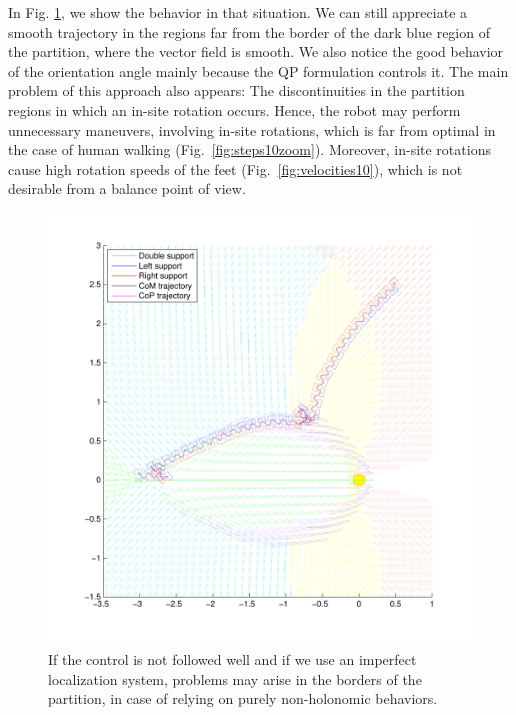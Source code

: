In Fig. \ref{fig:steps10}, we show the behavior in that situation. We can still appreciate a smooth trajectory in the regions far from the border of the dark blue region of the partition, where the vector field is smooth. We also notice the good behavior of the orientation angle mainly because the QP formulation controls it. The main problem of this approach also appears: The discontinuities in the partition regions in which an in-site rotation occurs. Hence, the robot may perform unnecessary maneuvers, involving in-site rotations, which is far from optimal in the case of human walking (Fig.~\ref{fig:steps10zoom}). Moreover, in-site rotations cause high rotation speeds of the feet (Fig.~\ref{fig:velocities10}), which is not desirable from a balance point of view.

\begin{figure}[ht]
\centering
\includegraphics[scale=0.8  ]{Chap5-Visual-Planning/steps10.pdf}
\caption{If the control is not followed well and if we use an imperfect localization system, problems may arise in the borders of the partition, in case of relying on purely non-holonomic behaviors.}
\label{fig:steps10}
\end{figure}

